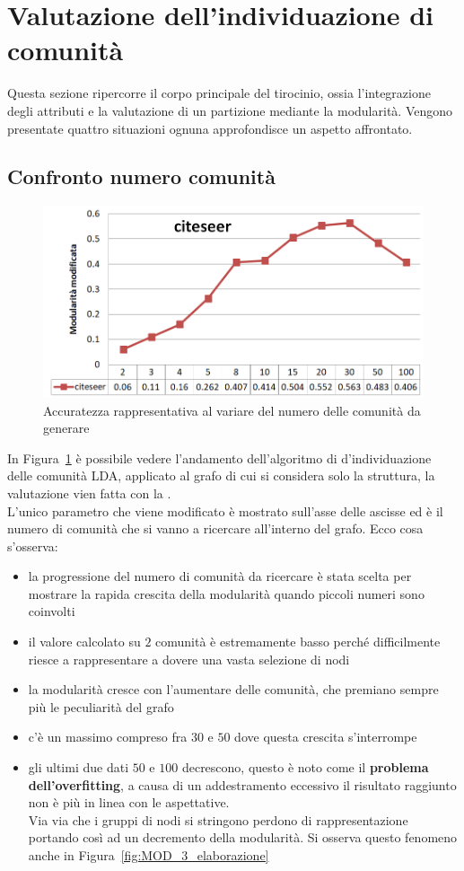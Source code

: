 \section{Valutazione dell'individuazione di comunità}
Questa sezione ripercorre il corpo principale del tirocinio, ossia l'integrazione degli attributi e la valutazione di un partizione mediante la modularità. Vengono presentate quattro situazioni ognuna approfondisce un aspetto affrontato.
%
\subsection{Confronto numero comunità}%
%
\begin{figure}[htp]
	\centering
	\includegraphics[width=\linewidth]{immagini/MOD_1_num_cmty}
	\caption{Accuratezza rappresentativa al variare del numero delle comunità da generare}
	\label{fig:MOD_1_num_cmty}
\end{figure}
%
In Figura~\ref{fig:MOD_1_num_cmty} è possibile vedere l'andamento dell'algoritmo di d'individuazione delle comunità LDA, applicato al grafo \citeseer di cui si considera solo la struttura, la valutazione vien fatta con la \mmod.\\
L'unico parametro che viene modificato è mostrato sull'asse delle ascisse ed è il numero di comunità che si vanno a ricercare all'interno del grafo. Ecco cosa s'osserva:
\begin{itemize}
	\item la progressione del numero di comunità da ricercare è stata scelta per mostrare la rapida crescita della modularità quando piccoli numeri sono coinvolti
	\item il valore calcolato su $2$ comunità è estremamente basso perché difficilmente riesce a rappresentare a dovere una vasta selezione di nodi
	\item la modularità cresce con l'aumentare delle comunità, che premiano sempre più le peculiarità del grafo
	\item c'è un massimo compreso fra $30$ e $50$ dove questa crescita s'interrompe
	\item gli ultimi due dati $50$ e $100$ decrescono, questo è noto come il \textbf{problema dell'overfitting}, a causa di un addestramento eccessivo il risultato raggiunto non è più in linea con le aspettative.\\
	Via via che i gruppi di nodi si stringono perdono di rappresentazione portando così ad un decremento della modularità. Si osserva questo fenomeno anche in Figura~\ref{fig:MOD_3_elaborazione}
\end{itemize}

